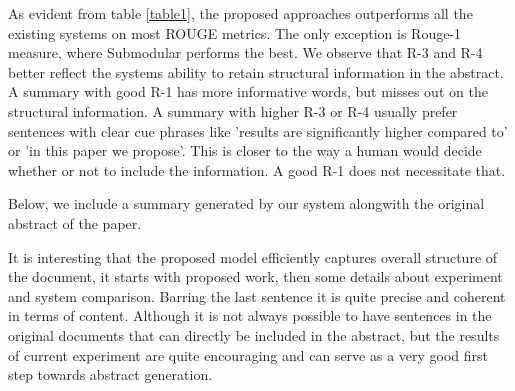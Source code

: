 As evident from table \ref{table1}, the proposed approaches outperforms all the existing systems on most ROUGE metrics. The only exception is Rouge-1 measure, where Submodular performs the best. We observe that R-3 and R-4 better reflect the systems ability to retain structural information in the abstract. A summary with good R-1 has more informative words, but misses out on the structural information. A summary with higher R-3 or R-4 usually prefer sentences with clear cue phrases like 'results are significantly higher compared to' or 'in this paper we propose'. This is closer to the way a human would decide whether or not to include  the information. A good R-1 does not necessitate that.

Below, we include a summary generated by our system alongwith the original abstract of the paper. 

It is interesting that the proposed model efficiently captures overall structure of the document, it starts with proposed work, then some details about experiment and system comparison. Barring the last sentence it is quite precise and coherent in terms of content. Although it is not always possible to have sentences in the original documents that can directly be included in the abstract, but the results of current experiment are quite encouraging and can serve as a very good first step towards abstract generation.

